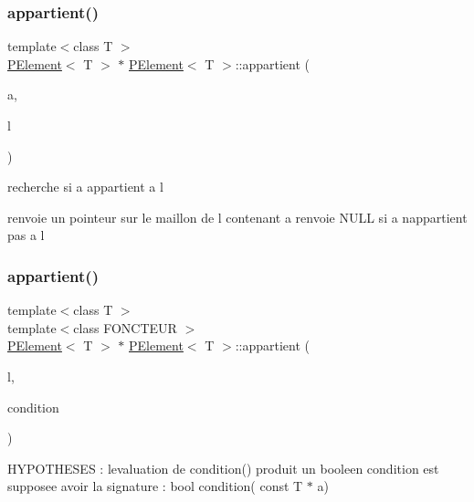 \subsubsection{\texorpdfstring{appartient()}{appartient()}\hspace{0.1cm}{\footnotesize\ttfamily [1/2]}}
{\footnotesize\ttfamily template$<$class T $>$ \\
\mbox{\hyperlink{class_p_element}{P\+Element}}$<$ T $>$ $\ast$ \mbox{\hyperlink{class_p_element}{P\+Element}}$<$ T $>$\+::appartient (\begin{DoxyParamCaption}\item[{const T $\ast$}]{a,  }\item[{\mbox{\hyperlink{class_p_element}{P\+Element}}$<$ T $>$ $\ast$}]{l }\end{DoxyParamCaption})\hspace{0.3cm}{\ttfamily [static]}}

recherche si a appartient a l

renvoie un pointeur sur le maillon de l contenant a renvoie N\+U\+LL si a n\textquotesingle{}appartient pas a l \mbox{\label{class_p_element_ad1ad40db30605db39a57c08058cf444c}} 
\subsubsection{\texorpdfstring{appartient()}{appartient()}\hspace{0.1cm}{\footnotesize\ttfamily [2/2]}}
{\footnotesize\ttfamily template$<$class T $>$ \\
template$<$class F\+O\+N\+C\+T\+E\+UR $>$ \\
\mbox{\hyperlink{class_p_element}{P\+Element}}$<$ T $>$ $\ast$ \mbox{\hyperlink{class_p_element}{P\+Element}}$<$ T $>$\+::appartient (\begin{DoxyParamCaption}\item[{\mbox{\hyperlink{class_p_element}{P\+Element}}$<$ T $>$ $\ast$}]{l,  }\item[{const F\+O\+N\+C\+T\+E\+UR \&}]{condition }\end{DoxyParamCaption})\hspace{0.3cm}{\ttfamily [static]}}

H\+Y\+P\+O\+T\+H\+E\+S\+ES \+: l\textquotesingle{}evaluation de condition() produit un booleen condition est supposee avoir la signature \+: bool condition( const T $\ast$ a)

